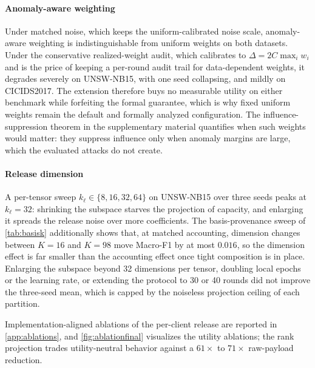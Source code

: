 \documentclass[a4paper,fleqn]{cas-dc}
\begin{document}
\paragraph{Anomaly-aware weighting}
Under matched noise, which keeps the uniform-calibrated noise scale,
anomaly-aware weighting is indistinguishable from uniform weights on both
datasets. Under the conservative realized-weight audit, which calibrates to
$\Delta = 2C\max_i w_i$ and is the price of keeping a per-round audit trail
for data-dependent weights, it degrades severely on UNSW-NB15, with one seed
collapsing, and mildly on CICIDS2017. The extension therefore buys
no measurable utility on either benchmark while forfeiting the formal
guarantee, which is why fixed uniform weights remain the default and
formally analyzed configuration. The influence-suppression theorem in the
supplementary material quantifies when such weights would matter: they suppress influence only when anomaly margins
are large, which the evaluated attacks do not create.
\par
\paragraph{Release dimension}
A per-tensor sweep $k_\ell\in\{8,16,32,64\}$ on UNSW-NB15 over three seeds
peaks at $k_\ell=32$: shrinking the subspace starves the projection of
capacity, and enlarging it spreads the release noise over more coefficients.
The basis-provenance sweep of \cref{tab:basisk} additionally shows
that, at matched accounting, dimension changes between $K=16$ and $K=98$
move Macro-F1 by at most $0.016$, so the dimension effect is far smaller
than the accounting effect once tight composition is in place. Enlarging the
subspace beyond 32 dimensions per tensor, doubling local epochs or the
learning rate, or extending the protocol to 30 or 40 rounds did not improve
the three-seed mean, which is capped by the noiseless projection ceiling of
each partition.
\par
Implementation-aligned ablations of the per-client release are reported in
\cref{app:ablations}, and \cref{fig:ablationfinal} visualizes the
utility ablations; the rank projection trades utility-neutral
behavior against a $61\times$ to $71\times$ raw-payload reduction.
\par
\end{document}
